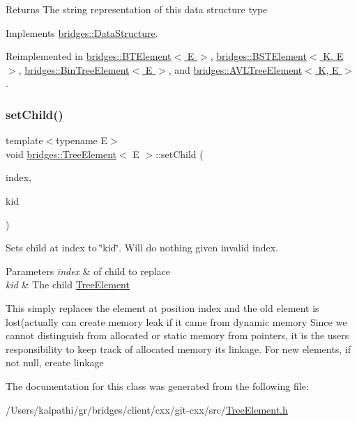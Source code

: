 \begin{DoxyReturn}{Returns}
The string representation of this data structure type 
\end{DoxyReturn}


Implements \hyperlink{classbridges_1_1_data_structure_a957a63b106e340bc753620c650632bdc}{bridges\+::\+Data\+Structure}.



Reimplemented in \hyperlink{classbridges_1_1_b_t_element_a43cc18d2c1e71c399782a306b60e4260}{bridges\+::\+B\+T\+Element$<$ E $>$}, \hyperlink{classbridges_1_1_b_s_t_element_af3843873c508c24f90b6e73a6f490bf8}{bridges\+::\+B\+S\+T\+Element$<$ K, E $>$}, \hyperlink{classbridges_1_1_bin_tree_element_a0a154f68ef0a58715e598a6ef92b9e59}{bridges\+::\+Bin\+Tree\+Element$<$ E $>$}, and \hyperlink{classbridges_1_1_a_v_l_tree_element_a24c005f8e07a7a2682225cead3b7e364}{bridges\+::\+A\+V\+L\+Tree\+Element$<$ K, E $>$}.

\hypertarget{classbridges_1_1_tree_element_aa12cb7cb4b4f559bdf0967872b0a6e7d}{}\label{classbridges_1_1_tree_element_aa12cb7cb4b4f559bdf0967872b0a6e7d} 
\subsubsection{\texorpdfstring{set\+Child()}{setChild()}}
{\footnotesize\ttfamily template$<$typename E$>$ \\
void \hyperlink{classbridges_1_1_tree_element}{bridges\+::\+Tree\+Element}$<$ E $>$\+::set\+Child (\begin{DoxyParamCaption}\item[{const size\+\_\+t \&}]{index,  }\item[{\hyperlink{classbridges_1_1_tree_element}{Tree\+Element}$<$ E $>$ $\ast$}]{kid }\end{DoxyParamCaption})\hspace{0.3cm}{\ttfamily [inline]}}

Sets child at index to \char`\"{}kid\char`\"{}. Will do nothing given invalid index.


\begin{DoxyParams}{Parameters}
{\em index} & of child to replace \\
\hline
{\em kid} & The child \hyperlink{classbridges_1_1_tree_element}{Tree\+Element} \\
\hline
\end{DoxyParams}
This simply replaces the element at position index and the old element is lost(actually can create memory leak if it came from dynamic memory Since we cannot distinguish from allocated or static memory from pointers, it is the user\textquotesingle{}s responsibility to keep track of allocated memory its linkage. For new elements, if not null, create linkage

The documentation for this class was generated from the following file\+:\begin{DoxyCompactItemize}
\item 
/\+Users/kalpathi/gr/bridges/client/cxx/git-\/cxx/src/\hyperlink{_tree_element_8h}{Tree\+Element.\+h}\end{DoxyCompactItemize}
